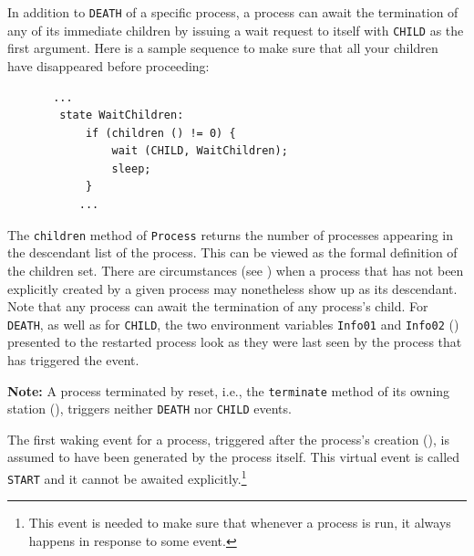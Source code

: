 In addition to {\tt DEATH} of a specific process, a process can await the
termination of any of its immediate children by issuing a wait request to
itself with {\tt CHILD} as the first argument.
Here is a sample sequence to make sure that all your children have disappeared
before proceeding:
\begin{verbatim}
       ...
        state WaitChildren:
            if (children () != 0) {
                wait (CHILD, WaitChildren);
                sleep;
            }
           ...
\end{verbatim}
The {\tt children} method of {\tt Process} returns the number of
processes appearing in the descendant list of the process.
This can be viewed as the formal definition of the children set.
There are circumstances (see ) when a process
that has not been explicitly created by a given process may nonetheless
show up as its descendant.
Note that any process can await the termination of any process's child.
For {\tt DEATH}, as well as for {\tt CHILD}, the two environment variables
{\tt Info01} and {\tt Info02} () presented to the restarted
process look as they were last seen by the process that has
triggered the event.

\medskip

\noindent
{\bf Note:}
A process terminated by reset, i.e., the {\tt terminate} method of its
owning station (), triggers neither {\tt DEATH} nor
{\tt CHILD} events.

\medskip

The first waking event for a process, triggered after the process's creation
(), is assumed to have been generated by the process itself.
This virtual event is called {\tt START} and it cannot be awaited
explicitly.\footnote{This event is needed to make sure that whenever a process
is run, it always happens in response to some event.}

